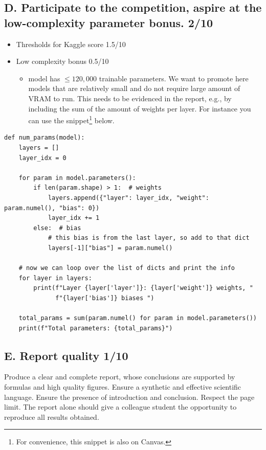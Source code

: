 \documentclass[11pt,a4paper]{article}
\begin{document}
\subsection*{D. Participate to the competition, aspire at the low-complexity parameter bonus. 2/10}
\begin{itemize}
    \item Thresholds for Kaggle score 1.5/10
    \item Low complexity bonus 0.5/10
    \begin{itemize}
        \item model has \(\le 120{,}000\) trainable parameters. We want to promote here models that are relatively small and do not require large amount of VRAM to run. This needs to be evidenced in the report, e.g., by including the sum of the amount of weights per layer. For instance you can use the snippet\footnote{For convenience, this snippet is also on Canvas.} below.
    \end{itemize}
\end{itemize}

\begin{verbatim}
def num_params(model):
    layers = []
    layer_idx = 0

    for param in model.parameters():
        if len(param.shape) > 1:  # weights
            layers.append({"layer": layer_idx, "weight": param.numel(), "bias": 0})
            layer_idx += 1
        else:  # bias
            # this bias is from the last layer, so add to that dict
            layers[-1]["bias"] = param.numel()

    # now we can loop over the list of dicts and print the info
    for layer in layers:
        print(f"Layer {layer['layer']}: {layer['weight']} weights, "
              f"{layer['bias']} biases ")

    total_params = sum(param.numel() for param in model.parameters())
    print(f"Total parameters: {total_params}")
\end{verbatim}

\subsection*{E. Report quality 1/10}
Produce a clear and complete report, whose conclusions are supported by formulas and high quality figures. Ensure a synthetic and effective scientific language. Ensure the presence of introduction and conclusion. Respect the page limit. The report alone should give a colleague student the opportunity to reproduce all results obtained.
\end{document}
